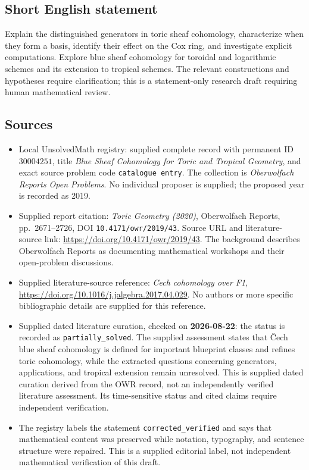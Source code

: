 \documentclass[11pt]{article}
\begin{document}
\subsection{Short English statement}
Explain the distinguished generators in toric sheaf cohomology, characterize when they form a basis, identify their effect on the Cox ring, and investigate explicit computations. Explore blue sheaf cohomology for toroidal and logarithmic schemes and its extension to tropical schemes. The relevant constructions and hypotheses require clarification; this is a statement-only research draft requiring human mathematical review.
\subsection{Sources}
\begin{itemize}
\item Local UnsolvedMath registry: supplied complete record with permanent ID \(30004251\), title \emph{Blue Sheaf Cohomology for Toric and Tropical Geometry}, and exact source problem code \texttt{catalogue entry}. The collection is \emph{Oberwolfach Reports Open Problems}. No individual proposer is supplied; the proposed year is recorded as 2019.
\item Supplied report citation: \emph{Toric Geometry (2020)}, Oberwolfach Reports, pp.\ 2671--2726, DOI \texttt{10.4171/owr/2019/43}. Source URL and literature-source link: \url{https://doi.org/10.4171/owr/2019/43}. The background describes Oberwolfach Reports as documenting mathematical workshops and their open-problem discussions.
\item Supplied literature-source reference: \emph{Cech cohomology over F1}, \url{https://doi.org/10.1016/j.jalgebra.2017.04.029}. No authors or more specific bibliographic details are supplied for this reference.
\item Supplied dated literature curation, checked on \textbf{2026-08-22}: the status is recorded as \texttt{partially\_solved}. The supplied assessment states that \v{C}ech blue sheaf cohomology is defined for important blueprint classes and refines toric cohomology, while the extracted questions concerning generators, applications, and tropical extension remain unresolved. This is supplied dated curation derived from the OWR record, not an independently verified literature assessment. Its time-sensitive status and cited claims require independent verification.
\item The registry labels the statement \texttt{corrected\_verified} and says that mathematical content was preserved while notation, typography, and sentence structure were repaired. This is a supplied editorial label, not independent mathematical verification of this draft.
\end{itemize}
\end{document}

